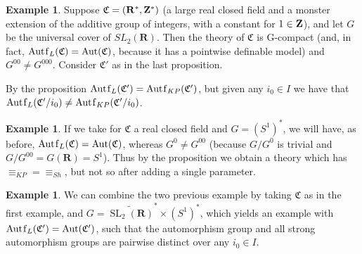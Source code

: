 \documentclass[final,a4paper,12pt]{amsart}
\newcommand{\fC}{{\mathfrak C}}
\newcommand{\bR}{{\mathbf{R}}}
\DeclareMathOperator{\Aut}{{Aut}}
\DeclareMathOperator{\Autf}{{Aut\mkern 0.5\thinmuskip f}}
\DeclareMathOperator{\SL}{{SL}}
\theoremstyle{remark}
\theoremstyle{definition}
\newtheorem{ex}[thm]{Example}
\begin{document}
	\begin{ex}
		Suppose $\fC=({\bR}^*,{\bf Z}^*)$ (a large real closed field and a monster extension of the additive group of integers, with a constant for $1\in {\bf Z}$), and let $G$ be the universal cover of $SL_2({\bR})$. Then the theory of $\fC$ is G-compact (and, in fact, $\Autf_L(\fC)=\Aut(\fC)$, because it has a pointwise definable model)  and  $G^{00}\neq G^{000}$. Consider $\fC'$ as in the last proposition.
		
		By the proposition $\Autf_L(\fC')=\Autf_{KP}(\fC')$, but given any $i_0\in I$ we have that $\Autf_L(\fC'/i_0)\neq \Autf_{KP}(\fC'/i_0)$.
	\end{ex}
	
	\begin{ex}
		If we take for $\fC$ a real closed field and $G=(S^1)^*$, we will have, as before, $\Autf_L(\fC)=\Aut(\fC)$, whereas $G^0\neq G^{00}$ (because $G/G^0$ is trivial and $G/G^{00}=G({\bR})=S^1$). Thus by the proposition we obtain a theory which has ${\equiv_{KP}}={\equiv_{Sh}}$, but not so after adding a single parameter.
	\end{ex}
	
	\begin{ex}
		We can combine the two previous example by taking $\fC$ as in the first example, and $G=\widetilde{\SL_2({\bR})}^*\times (S^1)^*$, which yields an example with $\Autf_L(\fC')=\Aut(\fC')$, such that the automorphism group and all strong automorphism groups are pairwise distinct over any $i_0\in I$.
	\end{ex}
	
	
	
\end{document}
